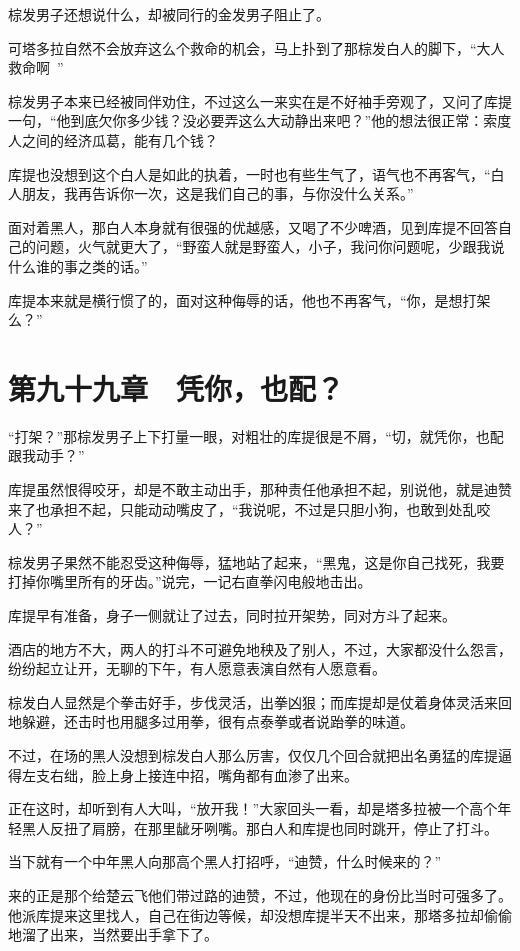 棕发男子还想说什么，却被同行的金发男子阻止了。

可塔多拉自然不会放弃这么个救命的机会，马上扑到了那棕发白人的脚下，“大人救命啊~”

棕发男子本来已经被同伴劝住，不过这么一来实在是不好袖手旁观了，又问了库提一句，“他到底欠你多少钱？没必要弄这么大动静出来吧？”他的想法很正常：索度人之间的经济瓜葛，能有几个钱？

库提也没想到这个白人是如此的执着，一时也有些生气了，语气也不再客气，“白人朋友，我再告诉你一次，这是我们自己的事，与你没什么关系。”

面对着黑人，那白人本身就有很强的优越感，又喝了不少啤酒，见到库提不回答自己的问题，火气就更大了，“野蛮人就是野蛮人，小子，我问你问题呢，少跟我说什么谁的事之类的话。”

库提本来就是横行惯了的，面对这种侮辱的话，他也不再客气，“你，是想打架么？”

\section{第九十九章　凭你，也配？}

“打架？”那棕发男子上下打量一眼，对粗壮的库提很是不屑，“切，就凭你，也配跟我动手？”

库提虽然恨得咬牙，却是不敢主动出手，那种责任他承担不起，别说他，就是迪赞来了也承担不起，只能动动嘴皮了，“我说呢，不过是只胆小狗，也敢到处乱咬人？”

棕发男子果然不能忍受这种侮辱，猛地站了起来，“黑鬼，这是你自己找死，我要打掉你嘴里所有的牙齿。”说完，一记右直拳闪电般地击出。

库提早有准备，身子一侧就让了过去，同时拉开架势，同对方斗了起来。

酒店的地方不大，两人的打斗不可避免地秧及了别人，不过，大家都没什么怨言，纷纷起立让开，无聊的下午，有人愿意表演自然有人愿意看。

棕发白人显然是个拳击好手，步伐灵活，出拳凶狠；而库提却是仗着身体灵活来回地躲避，还击时也用腿多过用拳，很有点泰拳或者说跆拳的味道。

不过，在场的黑人没想到棕发白人那么厉害，仅仅几个回合就把出名勇猛的库提逼得左支右绌，脸上身上接连中招，嘴角都有血渗了出来。

正在这时，却听到有人大叫，“放开我！”大家回头一看，却是塔多拉被一个高个年轻黑人反扭了肩膀，在那里龇牙咧嘴。那白人和库提也同时跳开，停止了打斗。

当下就有一个中年黑人向那高个黑人打招呼，“迪赞，什么时候来的？”

来的正是那个给楚云飞他们带过路的迪赞，不过，他现在的身份比当时可强多了。他派库提来这里找人，自己在街边等候，却没想库提半天不出来，那塔多拉却偷偷地溜了出来，当然要出手拿下了。

